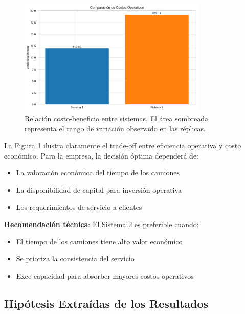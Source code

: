\documentclass[a4paper, 12pt]{article}
\begin{document}
  \begin{figure}[H]
  	\centering
  	\includegraphics[width=0.8\textwidth]{figures/cost_comparison.png}
  	\caption{Relación costo-beneficio entre sistemas. El área sombreada representa el rango de variación observado en las réplicas.}
  	\label{fig:cost}
  \end{figure}
  
  La Figura \ref{fig:cost} ilustra claramente el trade-off entre eficiencia operativa y costo económico. Para la empresa, la decisión óptima dependerá de:
  
  \begin{itemize}
  	\item La valoración económica del tiempo de los camiones
  	\item La disponibilidad de capital para inversión operativa
  	\item Los requerimientos de servicio a clientes
  \end{itemize}
  
  \textbf{Recomendación técnica}: El Sistema 2 es preferible cuando:
  \begin{itemize}
  	\item El tiempo de los camiones tiene alto valor económico
  	\item Se prioriza la consistencia del servicio
  	\item Exce capacidad para absorber mayores costos operativos
  \end{itemize}
  
  
 \subsection{Hipótesis Extraídas de los Resultados}
 
\end{document}
